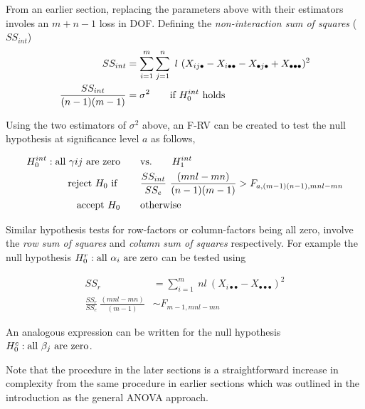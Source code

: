 From an earlier section, replacing the parameters above with their estimators involes an $ m+n-1 $ loss in DOF. Defining the \textit{non-interaction sum of squares} ($ SS_{int} $) \\

\begin{align}
	SS_{int} &= \sum\limits_{i = 1}^{m} \sum\limits_{j = 1}^{n}\ l\ (X_{ij\bullet} - X_{i\bullet \bullet} - X_{\bullet j \bullet} + X_{\bullet \bullet \bullet})^2 \\
	\frac{SS_{int}}{(n-1)(m-1)} &= \sigma^2 \qquad \text{if $ H_0^{int} $ holds}
\end{align}

Using the two estimators of $ \sigma^2 $ above, an F-RV can be created to test the null hypothesis at significance level $ a $ as follows,

\begin{align}
	H_0^{int} : \text{all $ \gamma{ij} $ are zero} \qquad &\text{vs.} \qquad H_1^{int} \nonumber \\
	\text{reject $ H_0 $ if } \qquad & \frac{SS_{int}}{SS_e}\ \frac{(mnl - mn)}{(n-1)(m-1)} > F_{a,(m-1)(n-1), mnl-mn} \nonumber \\
	\text{accept $ H_0 $} \qquad & \text{otherwise}
\end{align}

Similar hypothesis tests for row-factors or column-factors being all zero, involve the \textit{row sum of squares} and \textit{column sum of squares} respectively. For example the null hypothesis $ H_0^r : \text{all $ \alpha_i $ are zero} $ can be tested using

\begin{align}
	SS_r &= \sum\limits_{i = 1}^{m} \ nl\ (X_{i\bullet \bullet} - X_{\bullet \bullet \bullet})^2 \\
	\frac{SS_{r}}{SS_e}\ \frac{(mnl - mn)}{(m-1)} &\sim F_{m-1, mnl-mn} 
\end{align}

An analogous expression can be written for the null hypothesis $ H_0^c : \text{all $ \beta_j $ are zero} $.

Note that the procedure in the later sections is a straightforward increase in complexity from the same procedure in earlier sections which was outlined in the introduction as the general ANOVA approach.